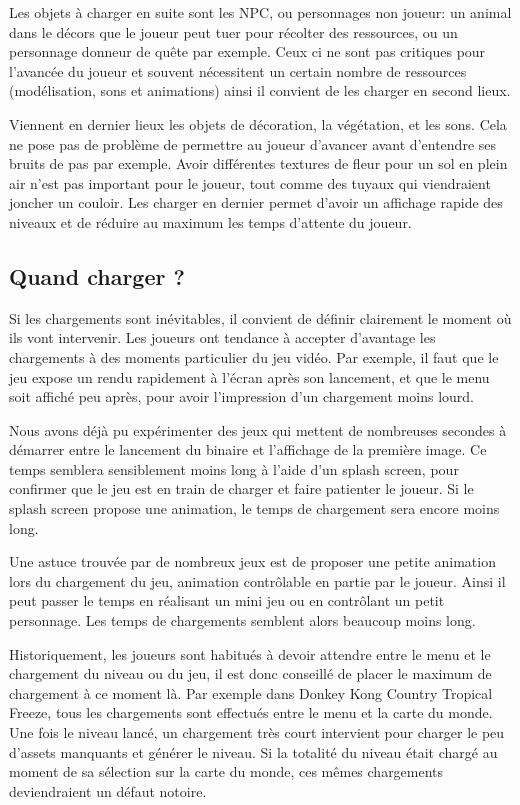 \documentclass[a4paper, 12pt]{article} %
\begin{document}
Les objets à charger en suite sont les NPC, ou personnages non joueur: un animal dans le décors que le joueur peut tuer pour récolter des ressources, ou un personnage donneur de quête par exemple. Ceux ci ne sont pas critiques pour l'avancée du joueur et souvent nécessitent un certain nombre de ressources (modélisation, sons et animations) ainsi il convient de les charger en second lieux. 

Viennent en dernier lieux les objets de décoration, la végétation, et les sons. Cela ne pose pas de problème de permettre au joueur d'avancer avant d'entendre ses bruits de pas par exemple. Avoir différentes textures de fleur pour un sol en plein air n'est pas important pour le joueur, tout comme des tuyaux qui viendraient joncher un couloir. Les charger en dernier permet d'avoir un affichage rapide des niveaux et de réduire au maximum les temps d'attente du joueur.

\newpage
\subsection{Quand charger ?}
Si les chargements sont inévitables, il convient de définir clairement le moment où ils vont intervenir. Les joueurs ont tendance à accepter d'avantage les chargements à des moments particulier du jeu vidéo. Par exemple, il faut que le jeu expose un rendu rapidement à l'écran après son lancement, et que le menu soit affiché peu après, pour avoir l'impression d'un chargement moins lourd. 

Nous avons déjà pu expérimenter des jeux qui mettent de nombreuses secondes à démarrer entre le lancement du binaire et l'affichage de la première image. Ce temps semblera sensiblement moins long à l'aide d'un splash screen, pour confirmer que le jeu est en train de charger et faire patienter le joueur. Si le splash screen propose une animation, le temps de chargement sera encore moins long.

Une astuce trouvée par de nombreux jeux est de proposer une petite animation lors du chargement du jeu, animation contrôlable en partie par le joueur. Ainsi il peut passer le temps en réalisant un mini jeu ou en contrôlant un petit personnage. Les temps de chargements semblent alors beaucoup moins long.

Historiquement, les joueurs sont habitués à devoir attendre entre le menu et le chargement du niveau ou du jeu, il est donc conseillé de placer le maximum de chargement à ce moment là. Par exemple dans Donkey Kong Country Tropical Freeze, tous les chargements sont effectués entre le menu et la carte du monde. Une fois le niveau lancé, un chargement très court intervient pour charger le peu d'assets manquants et générer le niveau. Si la totalité du niveau était chargé au moment de sa sélection sur la carte du monde, ces mêmes chargements deviendraient un défaut notoire.
\end{document}
